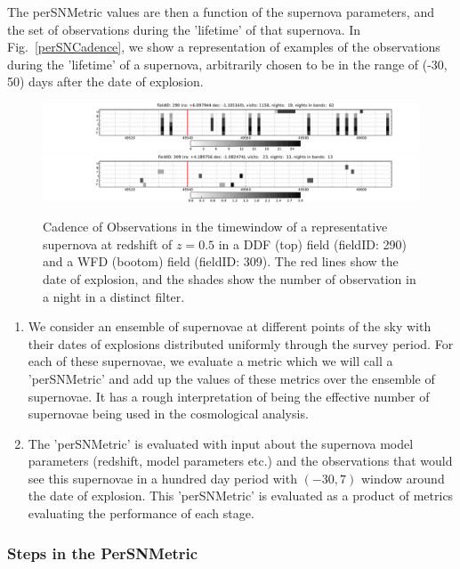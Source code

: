 The perSNMetric values are then a function of the supernova parameters, and the set of observations during the 'lifetime' of that supernova. 
In Fig.~\ref{perSNCadence}, we show a representation of examples of the observations during the 'lifetime' of a supernova, arbitrarily chosen to be in the range of (-30, 50) days after the date of explosion.
\begin{figure}[tbh!]
\includegraphics[angle=0,width=\textwidth,clip]{figs/SN_Cadence_290.pdf}
\includegraphics[angle=0,width=\textwidth,clip]{figs/SN_Cadence_309.pdf}
\caption{Cadence of Observations in the timewindow of a representative supernova at redshift of $z=0.5$ in a DDF (top) field (fieldID: 290) and a WFD (bootom) field (fieldID: 309). The red lines show the date of explosion, and the shades show the number of observation in a night in a distinct filter.}
\label{fig:perSNCadence}
\end{figure}


\begin{enumerate}
\item We consider an ensemble of supernovae at different points of the sky with  their dates of explosions distributed uniformly through the survey period. For each of these supernovae, we evaluate a metric which we will call a 'perSNMetric' and add up the values of these metrics over the ensemble of supernovae. It has a rough interpretation of being the effective number of supernovae being used in the cosmological analysis.
\item The 'perSNMetric' is evaluated with input about the supernova model parameters (redshift, model parameters etc.) and the observations that would see this supernovae in a hundred day period with $(-30, 7)$ window around the date of
explosion. This 'perSNMetric' is evaluated as a product of metrics evaluating
the performance of each stage. 
\end{enumerate}

\subsubsection{ Steps in the PerSNMetric}
